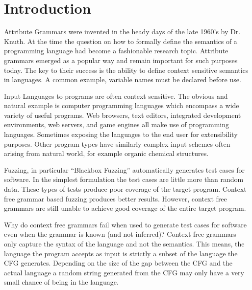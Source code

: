 
\section{Introduction}

Attribute Grammars were invented in the heady days of the late 1960's by Dr.
Knuth.\cite{Knuth1990} At the time the question on how to formally define the
semantics of a programming language had become a fashionable research topic.
Attribute grammars emerged as a popular way and remain important for such
purposes today. The key to their success is the ability to define context
sensitive semantics in languages. A common example, variable names must be
declared before use.

Input Languages to programs are often context sensitive. The obvious and natural
example is computer programming languages which encompass a wide variety of
useful programs. Web browsers, text editors, integrated development environments,
web servers, and game engines all make use of programming languages. Sometimes
exposing the languages to the end user for extensibility purposes. Other program
types have similarly complex input schemes often arising from natural world,
for example organic chemical structures.

Fuzzing, in particular ``Blackbox Fuzzing'' automatically generates test cases
for software. In the simplest formulation the test cases are little more than
random data. These types of tests produce poor coverage of the target program.
Context free grammar based fuzzing produces better results. However, context
free grammars are still unable to achieve good coverage of the entire target
program. 

Why do context free grammars fail when used to generate test cases for software
even when the grammar is known (and not inferred)? Context free grammars only
capture the syntax of the language and not the semantics. This means, the
language the program accepts as input is strictly a subset of the language the
CFG generates. Depending on the size of the gap between the CFG and the actual
language a random string generated from the CFG may only have a very small
chance of being in the language.

